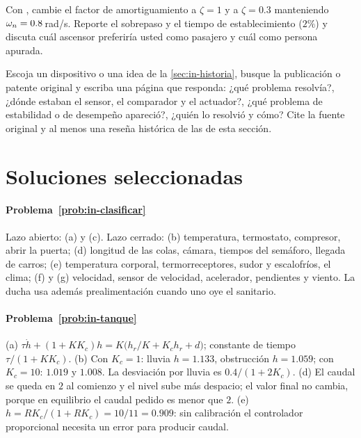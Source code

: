 \begin{problema}[el ascensor]\label{prob:in-ascensor}
\etiquetaM{} Con , cambie el factor de amortiguamiento a $\zeta=1$ y a $\zeta=0.3$ manteniendo $\omega_n=0.8$\,rad/s. Reporte el sobrepaso y el tiempo de establecimiento ($2\%$) y discuta cuál ascensor preferiría usted como pasajero y cuál como persona apurada.
\end{problema}

\begin{problema}\label{prob:in-historia}
\etiquetaEstrella{} Escoja un dispositivo o una idea de la \cref{sec:in-historia}, busque la publicación o patente original y escriba una página que responda: ¿qué problema resolvía?, ¿dónde estaban el sensor, el comparador y el actuador?, ¿qué problema de estabilidad o de desempeño apareció?, ¿quién lo resolvió y cómo? Cite la fuente original y al menos una reseña histórica de las de esta sección.
\end{problema}

\section{Soluciones seleccionadas}

\paragraph{Problema~\ref{prob:in-clasificar}}
Lazo abierto: (a) y (c). Lazo cerrado: (b) temperatura, termostato, compresor, abrir la puerta; (d) longitud de las colas, cámara, tiempos del semáforo, llegada de carros; (e) temperatura corporal, termorreceptores, sudor y escalofríos, el clima; (f) y (g) velocidad, sensor de velocidad, acelerador, pendientes y viento. La ducha usa además prealimentación cuando uno oye el sanitario.

\paragraph{Problema~\ref{prob:in-tanque}}
(a) $\tau\dot h+(1+KK_c)h=K\bigl(h_r/K+K_ch_r+d\bigr)$; constante de tiempo $\tau/(1+KK_c)$. (b) Con $K_c=1$: lluvia $h=1.133$, obstrucción $h=1.059$; con $K_c=10$: $1.019$ y $1.008$. La desviación por lluvia es $0.4/(1+2K_c)$. (d) El caudal se queda en $2$ al comienzo y el nivel sube más despacio; el valor final no cambia, porque en equilibrio el caudal pedido es menor que $2$. (e) $h=RK_c/(1+RK_c)=10/11=0.909$: sin calibración el controlador proporcional necesita un error para producir caudal.

